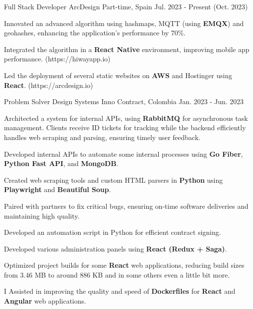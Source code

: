 \begin{cventries}
  \cventry
  {Full Stack Developer} %
  {ArcDesign} %
  {Part-time, Spain} %
  {Jul. 2023 - Present (Oct. 2023)} %
  {
    \begin{cvitems} %
      \item {Innovated an advanced algorithm using hashmaps, MQTT (using \textbf{EMQX}) and geohashes, enhancing the application's performance by 70\%.}
      \item {Integrated the algorithm in a \textbf{React Native} environment, improving mobile app performance. (https://hiwayapp.io)}
      \item {Led the deployment of several static websites on \textbf{AWS} and Hostinger using \textbf{React}. (https://arcdesign.io)}
    \end{cvitems}
  }
  \cventry
  {Problem Solver} %
  {Design Systems Inno} %
  {Contract, Colombia} %
  {Jan. 2023 - Jun. 2023} %
  {
    \begin{cvitems} %
      \item {Architected a system for internal APIs, using \textbf{RabbitMQ} for asynchronous task management. Clients receive ID tickets for tracking while the backend efficiently handles web scraping and parsing, ensuring timely user feedback.}
      \item {Developed internal APIs to automate some internal processes using \textbf{Go Fiber}, \textbf{Python Fast API}, and \textbf{MongoDB}.}
      \item {Created web scraping tools and custom HTML parsers in \textbf{Python} using \textbf{Playwright} and \textbf{Beautiful Soup}.}
      \item {Paired with partners to fix critical bugs, ensuring on-time software deliveries and maintaining high quality.}
      \item {Developed an automation script in Python for efficient contract signing.}
      \item {Developed various administration panels using \textbf{React (Redux + Saga)}.}
      \item {Optimized project builds for some \textbf{React} web applications, reducing build sizes from 3.46 MB to around 886 KB and in some others even a little bit more.}
      \item {I Assisted in improving the quality and speed of \textbf{Dockerfiles} for \textbf{React} and \textbf{Angular} web applications.}
    \end{cvitems}
  }


\end{cventries}
